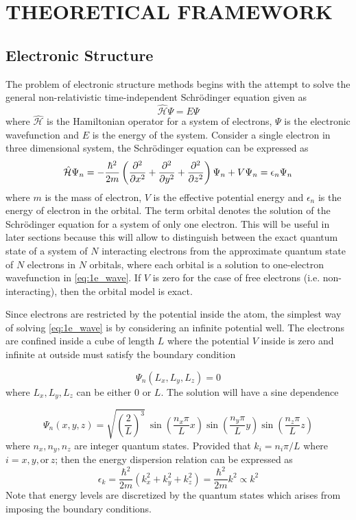 \chapter{THEORETICAL FRAMEWORK}
\section{Electronic Structure}
The problem of electronic structure methods begins with the attempt to solve the general non-relativistic time-independent Schr\"{o}dinger equation given as 
    \begin{equation} \label{eq:schrodinger}
        \hat{\mathcal{H}} \Psi = E \Psi
    \end{equation}
where $\hat{\mathcal{H}}$ is the Hamiltonian operator for a system of electrons, $\Psi$ is the electronic wavefunction and $E$ is the energy of the system. Consider a single electron in three dimensional system, the Schr\"{o}dinger equation can be expressed as 
    \begin{equation} \label{eq:1e_wave}
        \hat{\mathcal{H}} \Psi_n = - \frac{\hbar^2}{2m} \left(\pdv[2]{x} + \pdv[2]{y} + \pdv[2]{z} \right) \Psi_n + V \Psi_n  = \epsilon_n \Psi_n
    \end{equation}
where $m$ is the mass of electron, $V$ is the effective potential energy and $\epsilon_n$ is the energy of electron in the orbital. The term orbital denotes the solution of the Schr\"{o}dinger equation for a system of only one electron. This will be useful in later sections because this will allow to distinguish between the exact quantum state of a system of $N$ interacting  electrons 
from the approximate quantum state of $N$ electrons in $N$ orbitals, where each orbital is a solution to one-electron wavefunction in \eqref{eq:1e_wave}. If $V$ is zero for the case of free electrons (i.e. non-interacting), then the orbital model is exact. 
 
Since electrons are restricted by the potential inside the atom, the simplest way of solving \eqref{eq:1e_wave} is by considering an infinite potential well. The electrons are confined inside a cube of length $L$ where the potential $V$ inside is zero and infinite at outside must satisfy the boundary condition

\begin{equation}
	\Psi_n(L_x,L_y,L_z) = 0	
\end{equation}
where $L_x,L_y,L_z$ can be either 0 or $L$. The solution will have a sine dependence

\begin{equation}
	\Psi_n(x,y,z) = \sqrt{\left(\frac{2}{L}\right)^3} \ \sin(\frac{n_x \pi }{L} x) \sin(\frac{n_y \pi}{L} y) \sin(\frac{n_z \pi}{L} z)
\end{equation}
where $n_x,n_y,n_z$ are integer quantum states. Provided that $ k_i = n_i \pi / L$ where $i=x,y, \text{or}\, z$; then the energy dispersion relation can be expressed as 
\begin{equation} \label{eq:free_e}
    \epsilon_k = \frac{\hbar^2}{2m} (k_x^2 + k_y^2 + k_z^2) = \frac{\hbar^2}{2m} k^2 \propto k^2
\end{equation}
Note that energy levels are discretized by the quantum states which arises from imposing the boundary conditions. 
